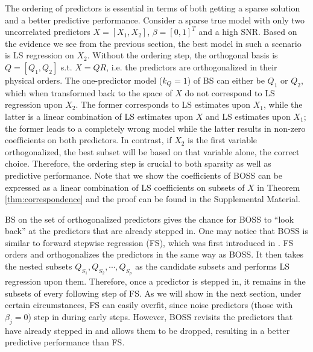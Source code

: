 The ordering of predictors is essential in terms of both getting a sparse solution and a better predictive performance. Consider a sparse true model with only two uncorrelated predictors $X=[X_1,X_2]$, $\beta=[0,1]^T$ and a high SNR. Based on the evidence we see from the previous section, the best model in such a scenario is LS regression on $X_2$. Without the ordering step, the orthogonal basis is $Q=[Q_1,Q_2]$ s.t. $X=QR$, i.e. the predictors are orthogonalized in their physical orders. The one-predictor model ($k_Q=1$) of BS can either be $Q_1$ or $Q_2$, which when transformed back to the space of $X$ do not correspond to LS regression upon $X_2$. The former corresponds to LS estimates upon $X_1$, while the latter is a linear combination of LS estimates upon $X$ and LS estimates upon $X_1$; the former leads to a completely wrong model while the latter results in non-zero coefficients on both predictors. In contrast, if $X_2$ is the first variable orthogonalized, the best subset will be based on that variable alone, the correct choice. Therefore, the ordering step is crucial to both sparsity as well as predictive performance. Note that we show the coefficients of BOSS can be expressed as a linear combination of LS coefficients on subsets of $X$ in Theorem \ref{thm:correspondence} and the proof can be found in the Supplemental Material. 

BS on the set of orthogonalized predictors gives the chance for BOSS to ``look back'' at the predictors that are already stepped in. One may notice that BOSS is similar to forward stepwise regression (FS), which was first introduced in \citet{efroymson1960multiple}. FS orders and orthogonalizes the predictors in the same way as BOSS. It then takes the nested subsets $Q_{S_1}, Q_{S_2}, \cdots, Q_{S_p}$ as the candidate subsets and performs LS regression upon them. Therefore, once a predictor is stepped in, it remains in the subsets of every following step of FS. As we will show in the next section, under certain circumstances, FS can easily overfit, since noise predictors (those with $\beta_j=0$) step in during early steps. However, BOSS revisits the predictors that have already stepped in and allows them to be dropped, resulting in a better predictive performance than FS.

